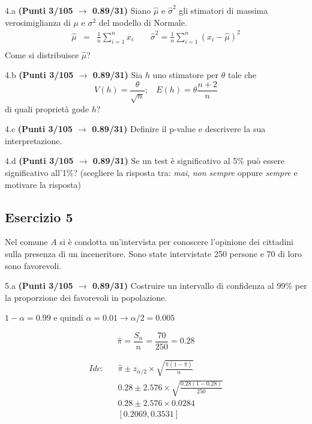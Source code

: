 \documentclass[
  11pt,
]{book}
\theoremstyle{mytheoremstyle}
\theoremstyle{mydefstyle}
\newenvironment{sol}
  {
  \begin{tcolorbox}[enhanced,breakable,arc=0.1mm,boxrule=1pt,colback=white,colframe=iblue,
  title=\bf \fontfamily{lmss}\selectfont \hspace{.5 cm} Soluzione,drop fuzzy shadow]

}{
\end{tcolorbox}
  }
\begin{document}
4.a \textbf{(Punti 3/105 \(\rightarrow\) 0.89/31)} Siano \(\hat \mu\) e \(\hat\sigma^2\) gli stimatori di massima verosimiglianza di \(\mu\) e \(\sigma^2\) del modello di Normale.
\begin{eqnarray*}
  \hat\mu &=&  \frac 1n\sum_{i=1}^nx_i \qquad \hat\sigma^2 =  \frac 1n\sum_{i=1}^n(x_i-\hat\mu)^2\\
\end{eqnarray*}
Come si distribuisce \(\hat\mu\)?

4.b \textbf{(Punti 3/105 \(\rightarrow\) 0.89/31)} Sia \(h\) uno stimatore per \(\theta\) tale che
\[V(h)=\frac\theta {\sqrt{n}};~~~~E(h)=\theta\frac{n+2}{n}\]
di quali proprietà gode \(h\)?

4.c \textbf{(Punti 3/105 \(\rightarrow\) 0.89/31)} Definire il p-value e descrivere la sua interpretazione.

4.d \textbf{(Punti 3/105 \(\rightarrow\) 0.89/31)} Se un test è significativo al 5\% può essere significativo all'1\%? (scegliere la risposta tra: \emph{mai}, \emph{non sempre} oppure \emph{sempre} e motivare la risposta)

\subsection{Esercizio 5}\label{esercizio-5-26}

Nel comune \(A\) si è condotta un'intervista per conoscere l'opinione
dei cittadini sulla presenza di un inceneritore. Sono state intervistate
250 persone e 70 di loro sono favorevoli.

5.a \textbf{(Punti 3/105 \(\rightarrow\) 0.89/31)} Costruire un intervallo di confidenza al 99\%
per la proporzione dei favorevoli in popolazione.

\begin{sol}
\(1-\alpha =0.99\) e quindi \(\alpha=0.01\rightarrow \alpha/2=0.005\)

\[
  \hat\pi = \frac{S_n}n = \frac{ 70 }{ 250 }= 0.28 
\]

\begin{eqnarray*}
  Idc: & &  \hat\pi \pm  z_{\alpha/2} \times \sqrt{\frac{\hat\pi(1-\hat\pi)}{n}} \\
     & &  0.28 \pm  2.576 \times \sqrt{\frac{ 0.28 (1- 0.28 )}{ 250 }} \\
     & &  0.28 \pm  2.576 \times  0.0284 \\
     & & [ 0.2069 ,  0.3531 ]
\end{eqnarray*}

\end{sol}
\end{document}
